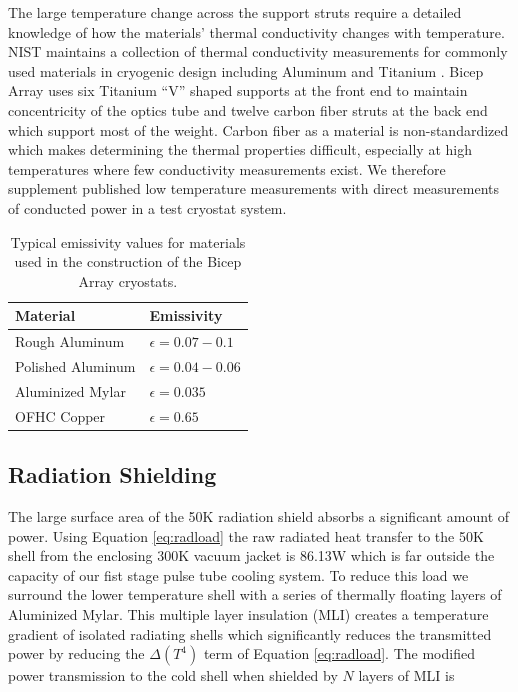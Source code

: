 \documentclass[12pt]{article}
\begin{document}
The large temperature change across the support struts require a detailed
knowledge of how the materials' thermal conductivity changes with temperature.
NIST maintains a collection of thermal conductivity measurements for commonly used
materials in cryogenic design including Aluminum and Titanium \cite{cite:NIST}. Bicep Array
uses six Titanium ``V'' shaped supports at the front end to maintain
concentricity of the  optics tube and twelve carbon fiber struts at the back end which support most of the
weight. Carbon fiber as a material is non-standardized which makes determining
the thermal properties difficult, especially at high temperatures where few
conductivity measurements exist. We therefore supplement published low
temperature measurements with direct measurements of conducted power in a test
cryostat system.
\begin{table}
	\center
\begin{tabular}{|l|l|}
	\hline
	\textbf{Material} & \textbf{Emissivity} \\
	\hline \hline
	Rough Aluminum & $\epsilon = 0.07-0.1$ \\
	Polished Aluminum & $\epsilon = 0.04 - 0.06$ \\
	Aluminized Mylar & $\epsilon = 0.035$ \\
	OFHC Copper & $\epsilon = 0.65$ \\ \hline
\end{tabular}
	\caption{Typical emissivity values for materials used in the construction
	of the Bicep Array cryostats.}
	\label{table:emis}
\end{table}



\subsection{Radiation Shielding}
The large surface area of the 50K radiation shield absorbs a significant
amount of power. Using Equation \ref{eq:radload} the raw radiated heat
transfer to the 50K shell from the enclosing 300K vacuum jacket is 86.13W which
is far outside the capacity of our fist stage pulse tube cooling system. To
reduce this load we surround the lower temperature shell with a series of
thermally floating layers of Aluminized Mylar. This multiple layer insulation
(MLI) creates a temperature gradient of isolated radiating shells which
significantly reduces the transmitted power by reducing the $\Delta (T^4)$
term of Equation \ref{eq:radload}. The modified power transmission to the cold
shell when shielded by $N$ layers of MLI is
\end{document}
